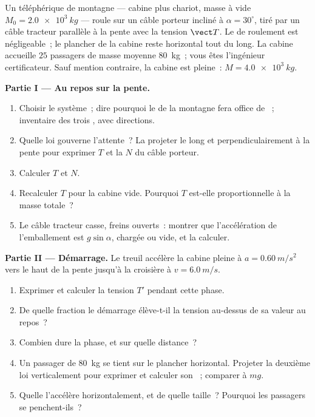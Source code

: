 \begin{problem}
\label{pb:g12:newtons-laws:1}
Un téléphérique de montagne --- cabine plus chariot, masse à vide
$M_0 = \qty{2.0e3}{kg}$ --- roule sur un câble porteur incliné à
$\alpha = 30^\circ$, tiré par un câble tracteur parallèle à la pente
avec la tension $\vect T$. Le 
de roulement est négligeable~; le plancher de la cabine reste horizontal
tout du long. La cabine accueille $25$ passagers de masse moyenne
\qty{80}{kg}~; vous êtes l'ingénieur certificateur. Sauf mention
contraire, la cabine est pleine~: $M = \qty{4.0e3}{kg}$.

\medskip
\noindent\textbf{Partie I --- Au repos sur la pente.}
\begin{enumerate}
  \item Choisir le système~; dire pourquoi le  de la montagne
        fera office de ~; inventaire des trois
        , avec directions.
  \item Quelle loi gouverne l'attente~? La projeter le long et
        perpendiculairement à la pente pour exprimer $T$ et la
         $N$ du câble porteur.
  \item Calculer $T$ et $N$.
  \item Recalculer $T$ pour la cabine vide. Pourquoi $T$ est-elle
        proportionnelle à la masse totale~?
  \item Le câble tracteur casse, freins ouverts~: montrer que
        l'accélération de l'emballement est $g \sin\alpha$, chargée ou
        vide, et la calculer.
\end{enumerate}

\medskip
\noindent\textbf{Partie II --- Démarrage.} Le treuil accélère la cabine
pleine à $a = \qty{0.60}{m/s^2}$ vers le haut de la pente jusqu'à la
croisière à $v = \qty{6.0}{m/s}$.
\begin{enumerate}[resume]
  \item Exprimer et calculer la tension $T'$ pendant
        cette phase.
  \item De quelle fraction le démarrage élève-t-il la
        tension au-dessus de sa valeur au repos~?
  \item Combien dure la phase, et sur quelle distance~?
  \item Un passager de \qty{80}{kg} se tient sur le plancher horizontal.
        Projeter la deuxième loi verticalement pour exprimer
        et calculer son ~; comparer à $mg$.
  \item Quelle  l'accélère horizontalement, et de
        quelle taille~? Pourquoi les passagers se penchent-ils~?
\end{enumerate}


\end{problem}
